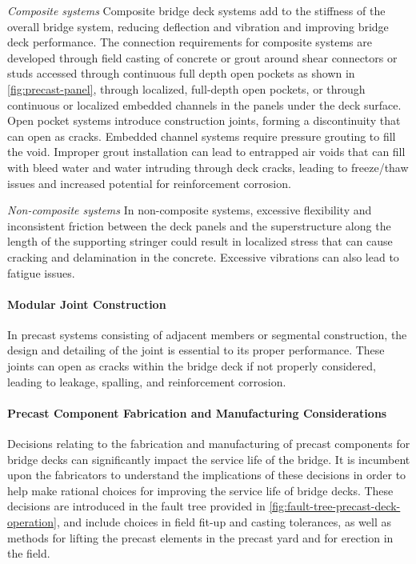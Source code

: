 \emph{Composite systems} Composite bridge deck systems add to the stiffness of the overall bridge system, reducing deflection and vibration and improving bridge deck performance. The connection requirements for composite systems are developed through field casting of concrete or grout around shear connectors or studs accessed through continuous full depth open pockets as shown in \cref{fig:precast-panel}, through localized, full-depth open pockets, or through continuous or localized embedded channels in the panels under the deck surface. Open pocket systems introduce construction joints, forming a discontinuity that can open as cracks. Embedded channel systems require pressure grouting to fill the void. Improper grout installation can lead to entrapped air voids that can fill with bleed water and water intruding through deck cracks, leading to freeze/thaw issues and increased potential for reinforcement corrosion.

\emph{Non-composite systems}
In non-composite systems, excessive flexibility and inconsistent friction between the deck panels and the superstructure along the length of the supporting stringer could result in localized stress that can cause cracking and delamination in the concrete. Excessive vibrations can also lead to fatigue issues.

\paragraph{Modular Joint Construction}
In precast systems consisting of adjacent members or segmental construction, the design and detailing of the joint is essential to its proper performance. These joints can open as cracks within the bridge deck if not properly considered, leading to leakage, spalling, and reinforcement corrosion.

\paragraph{Precast Component Fabrication and Manufacturing Considerations}
Decisions relating to the fabrication and manufacturing of precast components for bridge decks can significantly impact the service life of the bridge. It is incumbent upon the fabricators to understand the implications of these decisions in order to help make rational choices for improving the service life of bridge decks. These decisions are introduced in the fault tree provided in \cref{fig:fault-tree-precast-deck-operation}, and include choices in field fit-up and casting tolerances, as well as methods for lifting the precast elements in the precast yard and for erection in the field.

